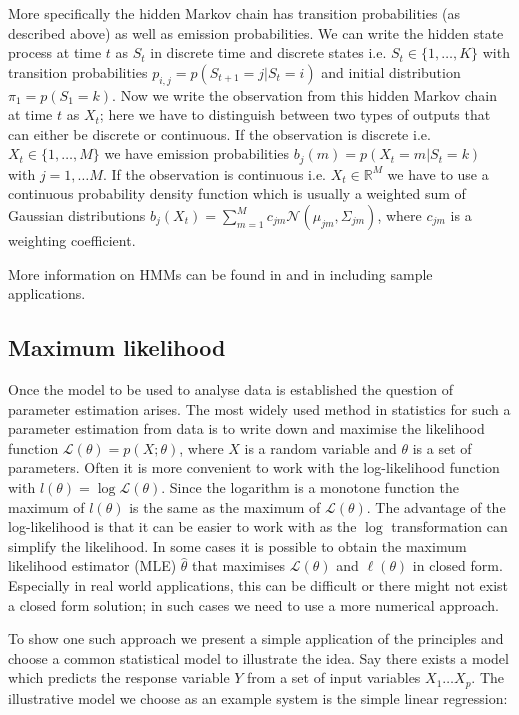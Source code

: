 More specifically the hidden Markov chain has transition probabilities (as described above) as well as emission probabilities. We can write the hidden state process at time $t$ as $S_t$ in discrete time and discrete states i.e. $S_t \in \lbrace 1, \ldots, K \rbrace$ with transition probabilities $p_{i,j} = p(S_{t+1} =j | S_t =i)$ and initial distribution $\pi_1 = p(S_1 = k)$. Now we write the observation from this hidden Markov chain at time $t$ as $X_t$; here we have to distinguish between two types of outputs that can either be discrete or continuous. If the observation is discrete i.e. $X_t \in \lbrace 1, \ldots, M \rbrace$ we have emission probabilities  $b_j(m) = p(X_t = m | S_t = k)$ with $j = 1, \ldots M$. If the observation is continuous i.e. $X_t \in \mathbb{R}^M$ we have to use a continuous probability density function which is usually a weighted sum of Gaussian distributions $b_j(X_t) = \sum_{m=1}^M c_{jm}\mathcal{N}(\mu_{jm}, \Sigma_{jm})$, where $c_{jm}$ is a weighting coefficient.

More information on HMMs can be found in \cite{MacDonald:1997wm} and in \cite{Zucchini:2009vl} including sample applications.


\subsection{Maximum likelihood}
\label{sec:least-squares}

Once the model to be used to analyse data is established the question of parameter estimation arises. The most widely used method in statistics for such a parameter estimation from data is  to write down and maximise the likelihood function $ \mathcal{L}(\theta) = p(X; \theta) $, where $X$ is a random variable and $\theta$ is a set of parameters. Often it is more convenient to work with the log-likelihood function with $l(\theta) = \log \mathcal{L}(\theta)$. Since the logarithm is a monotone function the maximum of $l (\theta)$ is the same as the maximum of $\mathcal{L} (\theta)$. The advantage of the log-likelihood is that it can be easier to work with as the $\log$ transformation can simplify the likelihood. In some cases it is possible to obtain the maximum likelihood estimator (MLE) $\hat{\theta}$ that maximises $\mathcal{L}(\theta)$ and $\ell (\theta)$ in closed form. Especially in real world applications, this can be difficult or there might not exist a closed form solution; in such cases we need to use a more numerical approach.

To show one such approach we present a simple application of the principles and choose a common statistical model to illustrate the idea. Say there exists a model which predicts the response variable $Y$ from a set of input variables $X_1 \ldots X_p$. The illustrative model we choose as an example system is the simple linear regression:

